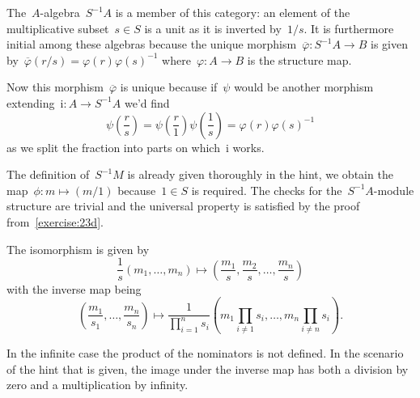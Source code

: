 \begin{exercise}
  \label{exercise:23d}
  The~$A$\nobreakdash-algebra~$S^{-1}A$ is a member of this category: an element of the multiplicative subset~$s\in S$ is a unit as it is inverted by~$1/s$. It is furthermore initial among these algebras because the unique morphism~$\overline{\varphi}\colon S^{-1}A\to B$ is given by~$\overline{\varphi}(r/s)=\varphi(r)\varphi(s)^{-1}$ where~$\varphi\colon A\to B$ is the structure map.

  Now this morphism~$\overline{\varphi}$ is unique because if~$\psi$ would be another morphism extending~$\mathrm{i}\colon A\to S^{-1}A$ we'd find
  \begin{equation}
    \psi\left( \frac{r}{s} \right)=\psi\left( \frac{r}{1} \right)\psi\left( \frac{1}{s} \right)=\varphi(r)\varphi(s)^{-1}
  \end{equation}
  as we split the fraction into parts on which~$\mathrm{i}$ works.
\end{exercise}

\begin{exercise}
  The definition of~$S^{-1}M$ is already given thoroughly in the hint, we obtain the map~$\phi\colon m\mapsto (m/1)$ because~$1\in S$ is required. The checks for the~$S^{-1}A$\nobreakdash-module structure are trivial and the universal property is satisfied by the proof from~\autoref{exercise:23d}.
\end{exercise}

\begin{exercise}
  The isomorphism is given by
  \begin{equation}
    \frac{1}{s}\left( m_1,\dots,m_n \right)\mapsto \left( \frac{m_1}{s},\frac{m_2}{s},\dots,\frac{m_n}{s} \right)
  \end{equation}
  with the inverse map being
  \begin{equation}
    \left( \frac{m_1}{s_1},\ldots,\frac{m_n}{s_n} \right)\mapsto\frac{1}{\prod_{i=1}^n s_i}\left( m_1\prod_{i\neq 1}s_i,\ldots,m_n\prod_{i\neq n}s_i \right).
  \end{equation}

  In the infinite case the product of the nominators is not defined. In the scenario of the hint that is given, the image under the inverse map has both a division by zero and a multiplication by infinity.
\end{exercise}

